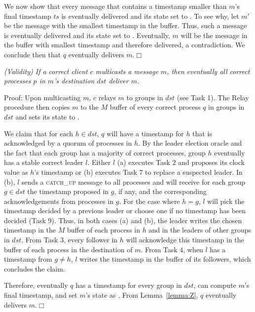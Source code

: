 We now show that every message that contains a timestamp smaller than $m$'s final timestamp $ts$ is eventually delivered and its state set to \done.
To see why, let $m'$ be the message with the smallest timestamp in the buffer.
Thus, such a message is eventually delivered and its state set to \ordered.
Eventually, $m$ will be the message in the buffer with smallest timestamp and therefore delivered, a contradiction.
We conclude then that $q$ eventually delivers $m$.\hfill$\Box$


\vspace{2mm}
\setcounter{proposition}{1}
\begin{proposition}
\textit{(Validity) If a correct client $c$ multicasts a message $m$, then eventually all correct processes $p$ in $m$'s destination $dst$ deliver $m$.}
\end{proposition}
\noindent
{\sc Proof:} 
Upon multicasting $m$, $c$ relays $m$ to groups in $dst$ (see Task 1).
The Relay procedure then copies $m$ to the $M$ buffer of every correct process $q$ in groups in $dst$ and sets its state to \mcast.

We claim that for each $h \in dst$, $q$ will have a timestamp for $h$ that is acknowledged by a quorum of processes in $h$.
By the leader election oracle and the fact that each group has a majority of correct processes, group $h$ eventually has a stable correct leader $l$.
Either $l$ (a) executes Task 2 and proposes its clock value as $h$'s timestamp or (b) executes Task 7 to replace a suspected leader.
In (b), $l$ sends a \textsc{catch\_up} message to all processes and will receive for each group $g \in dst$ the timestamp proposed in $g$, if any, and the corresponding acknowledgements from processes in $g$.
For the case where $h=g$, $l$ will pick the timestamp decided by a previous leader or choose one if no timestamp has been decided (Task 9).
Thus, in both cases (a) and (b), the leader writes the chosen timestamp in the $M$ buffer of each process in $h$ and in the leaders of other groups in $dst$.
From Task 3, every follower in $h$ will acknowledge this timestamp in the buffer of each process in the destination of $m$.
From Task 4, when $l$ has a timestamp from $g \neq h$, $l$ writes the timestamp in the buffer of its followers, which concludes the claim.

Therefore, eventually $q$ has a timestamp for every group in $dst$, can compute $m$'s final timestamp, and set $m$'s state as \ordered.
From Lemma~\ref{lemma:Z}, $q$ eventually delivers $m$.\hfill$\Box$


